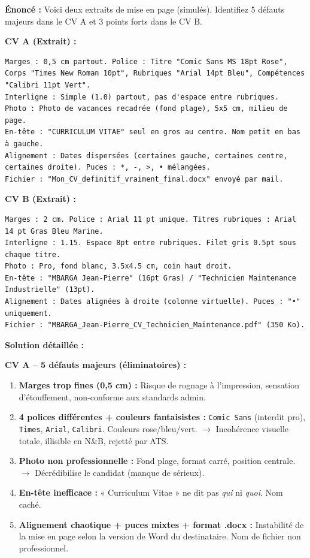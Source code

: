 \documentclass[11pt]{article}
\begin{document}
\begin{exoresolu}
\textbf{Énoncé :} Voici deux extraits de mise en page (simulés). Identifiez 5 défauts majeurs dans le CV A et 3 points forts dans le CV B.

\textbf{CV A (Extrait) :}
\begin{verbatim}
Marges : 0,5 cm partout. Police : Titre "Comic Sans MS 18pt Rose", Corps "Times New Roman 10pt", Rubriques "Arial 14pt Bleu", Compétences "Calibri 11pt Vert".
Interligne : Simple (1.0) partout, pas d'espace entre rubriques.
Photo : Photo de vacances recadrée (fond plage), 5x5 cm, milieu de page.
En-tête : "CURRICULUM VITAE" seul en gros au centre. Nom petit en bas à gauche.
Alignement : Dates dispersées (certaines gauche, certaines centre, certaines droite). Puces : *, -, >, • mélangées.
Fichier : "Mon_CV_definitif_vraiment_final.docx" envoyé par mail.
\end{verbatim}

\textbf{CV B (Extrait) :}
\begin{verbatim}
Marges : 2 cm. Police : Arial 11 pt unique. Titres rubriques : Arial 14 pt Gras Bleu Marine.
Interligne : 1.15. Espace 8pt entre rubriques. Filet gris 0.5pt sous chaque titre.
Photo : Pro, fond blanc, 3.5x4.5 cm, coin haut droit.
En-tête : "MBARGA Jean-Pierre" (16pt Gras) / "Technicien Maintenance Industrielle" (13pt).
Alignement : Dates alignées à droite (colonne virtuelle). Puces : "•" uniquement.
Fichier : "MBARGA_Jean-Pierre_CV_Technicien_Maintenance.pdf" (350 Ko).
\end{verbatim}

\tcblower
\textbf{Solution détaillée :}

\textbf{CV A -- 5 défauts majeurs (éliminatoires) :}
\begin{enumerate}
    \item \textbf{Marges trop fines (0,5 cm) :} Risque de rognage à l'impression, sensation d'étouffement, non-conforme aux standards admin.
    \item \textbf{4 polices différentes + couleurs fantaisistes :} \texttt{Comic Sans} (interdit pro), \texttt{Times}, \texttt{Arial}, \texttt{Calibri}. Couleurs rose/bleu/vert. $\rightarrow$ Incohérence visuelle totale, illisible en N\&B, rejetté par ATS.
    \item \textbf{Photo non professionnelle :} Fond plage, format carré, position centrale. $\rightarrow$ Décrédibilise le candidat (manque de sérieux).
    \item \textbf{En-tête inefficace :} « Curriculum Vitae » ne dit pas \emph{qui} ni \emph{quoi}. Nom caché.
    \item \textbf{Alignement chaotique + puces mixtes + format .docx :} Instabilité de la mise en page selon la version de Word du destinataire. Nom de fichier non professionnel.
\end{enumerate}


\end{exoresolu}
\end{document}
